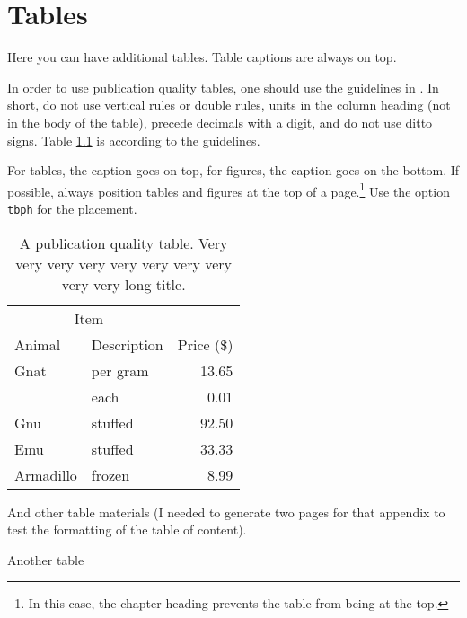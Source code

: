 \documentclass[msc,oneside]{ubcthesis}%
\begin{document}
\appendix 
\addappheadtotoc %
\appendixpage 



\chapter{Tables}

Here you can have additional tables. Table captions are always on top.

In order to use publication quality tables, one should use the
guidelines in \cite{Fear:2005manual}. In short, do not use vertical
rules or double rules, units in the column heading (not in the body of
the table), precede decimals with a digit, and do not use ditto
signs. Table \ref{table:food} is according to the guidelines.

For tables, the caption goes on top, for figures, the caption goes on
the bottom. If possible, always position tables and figures at the top
of a page.\footnote{In this case, the chapter heading prevents the
  table from being at the top.} Use the option \verb|tbph| for the
placement.

\begin{table}[tbph]
\centering
\caption{A publication quality table. Very very very very very very very very very very long title.
\label{table:food}}
\begin{tabular}{@{}llr@{}} \toprule 
\multicolumn{2}{c}{Item} \\ \cmidrule(r){1-2} 
Animal & Description & Price (\$)\\ \midrule 
Gnat & per gram & 13.65 \\ 
& each & 0.01 \\ 
Gnu & stuffed & 92.50 \\ 
Emu & stuffed & 33.33 \\ 
Armadillo & frozen & 8.99 \\ \bottomrule 
\end{tabular}
\end{table}

\newpage
And other table materials (I needed to generate two pages for that
appendix to test the formatting of the table of content).

\begin{table}
\caption{Another table}
\end{table}
\end{document}
